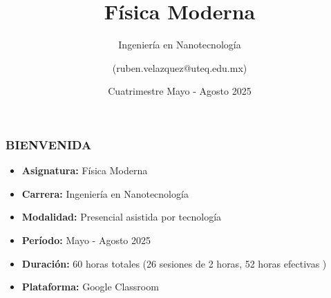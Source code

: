 \documentclass{beamer}
\title[Física Moderna]{Física Moderna}
\subtitle{Ingeniería en Nanotecnología}
\author{(ruben.velazquez@uteq.edu.mx)}
\institute[UTEQ]{Universidad Tecnológica de Querétaro}
\date{Cuatrimestre Mayo - Agosto 2025}
\begin{document}
\frame{\titlepage}

\begin{frame}
    \frametitle{BIENVENIDA}
    \begin{itemize}
        \item \textbf{Asignatura:} Física Moderna
        \item \textbf{Carrera:} Ingeniería en Nanotecnología
        \item \textbf{Modalidad:} Presencial asistida por tecnología
        \item \textbf{Período:} Mayo - Agosto 2025
        \item \textbf{Duración:} 60 horas totales (26 sesiones de 2 horas, 52 horas efectivas )
        \item \textbf{Plataforma:} Google Classroom
    \end{itemize}
\end{frame}

	
\end{document}
